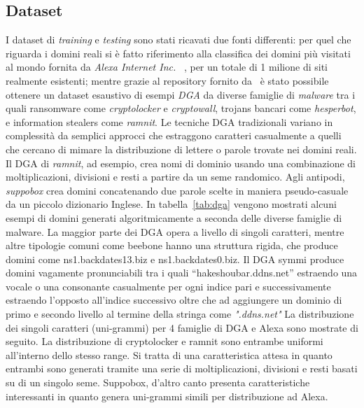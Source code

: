 \subsection{Dataset}
\label{pro:randomforestdataset}
I dataset di \textit{training} e \textit{testing} sono stati ricavati due fonti differenti: per quel che riguarda i domini reali si è fatto riferimento alla classifica dei domini più visitati al mondo fornita da \textit{Alexa Internet Inc.}~\cite{amazon:alexa} , per un totale di 1 milione di siti realmente esistenti; mentre grazie al repository fornito da~\cite{github:dgarepo} è stato possibile ottenere un dataset esaustivo di esempi \textit{DGA} da diverse famiglie di \textit{malware} tra i quali ransomware come \textit{cryptolocker} e \textit{cryptowall}, trojans bancari come \textit{hesperbot}, e information stealers come \textit{ramnit}. Le tecniche DGA tradizionali variano in complessità da semplici approcci che estraggono caratteri casualmente a quelli che cercano di mimare la distribuzione di lettere o parole trovate nei domini reali. Il DGA di \textit{ramnit}, ad esempio, crea nomi di dominio usando una combinazione di moltiplicazioni, divisioni e resti a partire da un seme randomico. Agli antipodi, \textit{suppobox} crea domini concatenando due parole scelte in maniera pseudo-casuale da un piccolo dizionario Inglese.
In tabella~\ref{tab:dga} vengono mostrati alcuni esempi di domini generati algoritmicamente a seconda delle diverse famiglie di malware.
La maggior parte dei DGA opera a livello di singoli caratteri, mentre altre tipologie comuni come beebone hanno una struttura rigida, che produce domini come ns1.backdates13.biz e ns1.backdates0.biz.
Il DGA symmi produce domini vagamente pronunciabili tra i quali “hakeshoubar.ddns.net” estraendo una vocale o una consonante casualmente per ogni indice pari e successivamente estraendo l'opposto all'indice successivo oltre che ad aggiungere un dominio di primo e secondo livello al termine della stringa come \textit{".ddns.net"}
La distribuzione dei singoli caratteri (uni-grammi) per 4 famiglie di DGA e Alexa sono mostrate di seguito. La distribuzione di cryptolocker e ramnit sono entrambe uniformi all'interno dello stesso range. Si tratta di una caratteristica attesa in quanto entrambi sono generati tramite una serie di moltiplicazioni, divisioni e resti basati su di un singolo seme. Suppobox, d'altro canto presenta caratteristiche interessanti in quanto genera uni-grammi simili per distribuzione ad Alexa. 

